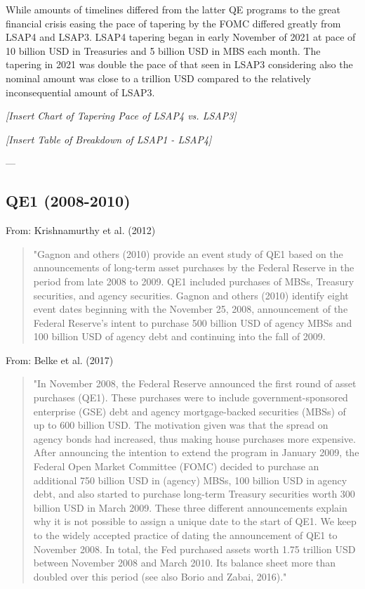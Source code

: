 While amounts of timelines differed from the latter QE programs to the great financial crisis easing the pace of tapering by the FOMC differed greatly from LSAP4 and LSAP3. LSAP4 tapering began in early November of 2021 at pace of 10 billion USD in Treasuries and 5 billion USD in MBS each month. The tapering in 2021 was double the pace of that seen in LSAP3 considering also the nominal amount was close to a trillion USD compared to the relatively inconsequential amount of LSAP3.

\textit{[Insert Chart of Tapering Pace of LSAP4 vs. LSAP3]}

\textit{[Insert Table of Breakdown of LSAP1 - LSAP4]}

---
\subsection{QE1 (2008-2010)}
From: Krishnamurthy et al. (2012)
\begin{quote}
"Gagnon and others (2010) provide an event study of QE1 based on the announcements of long-term asset purchases by the Federal Reserve in the period from late 2008 to 2009. QE1 included purchases of MBSs, Treasury securities, and agency securities. Gagnon and others (2010) identify eight event dates beginning with the November 25, 2008, announcement of the Federal Reserve’s intent to purchase 500 billion USD of agency MBSs and 100 billion USD of agency debt and continuing into the fall of 2009. 
\end{quote}
From: Belke et al. (2017)
\begin{quote}
"In November 2008, the Federal Reserve announced the first round of asset purchases (QE1). These purchases were to include government-sponsored enterprise (GSE) debt and agency mortgage-backed securities (MBSs) of up to 600 billion USD. The motivation given was that the spread on agency bonds had increased, thus making house purchases more expensive. After announcing the intention to extend the program in January 2009, the Federal Open Market Committee (FOMC) decided to purchase an additional 750 billion USD in (agency) MBSs, 100 billion USD in agency debt, and also started to purchase long-term Treasury securities worth 300 billion USD in March 2009. These three different announcements explain why it is not possible to assign a unique date to the start of QE1. We keep to the widely accepted practice of dating the announcement of QE1 to November 2008. In total, the Fed purchased assets worth 1.75 trillion USD between November 2008 and March 2010. Its balance sheet more than doubled over this period (see also Borio and Zabai, 2016)."
\end{quote}

